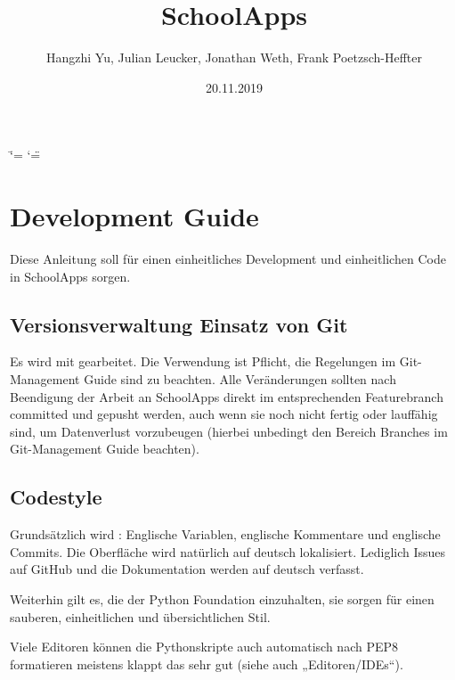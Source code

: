 \documentclass[letterpaper,10pt,ngerman]{sphinxmanual}
\title{SchoolApps}
\date{20.11.2019}
\author{Hangzhi Yu, Julian Leucker, Jonathan Weth, Frank Poetzsch-Heffter}
\begin{document}
\ifdefined\shorthandoff
  \ifnum\catcode`\=\string=\active\shorthandoff{=}\fi
  \ifnum\catcode`\"=\active{}\fi
\fi

\pagestyle{empty}
\sphinxmaketitle
\pagestyle{plain}
\sphinxtableofcontents
\pagestyle{normal}
\label{\detokenize{index::doc}}



\chapter{Development Guide}
\label{\detokenize{dev/dev:development-guide}}\label{\detokenize{dev/dev::doc}}
Diese Anleitung soll für einen einheitliches Development und einheitlichen Code in SchoolApps sorgen.


\section{Versionsverwaltung \textendash{} Einsatz von Git}
\label{\detokenize{dev/dev:versionsverwaltung-einsatz-von-git}}
Es wird mit  gearbeitet. Die Verwendung ist Pflicht, die Regelungen im Git-Management Guide sind zu beachten. Alle Veränderungen sollten nach Beendigung der Arbeit an SchoolApps direkt im entsprechenden Featurebranch committed und gepusht werden, auch wenn sie noch nicht fertig oder lauffähig sind, um Datenverlust vorzubeugen (hierbei unbedingt den Bereich Branches im Git-Management Guide beachten).


\section{Codestyle}
\label{\detokenize{dev/dev:codestyle}}
Grundsätzlich wird : Englische Variablen, englische Kommentare und englische Commits. Die Oberfläche wird natürlich auf deutsch lokalisiert. Lediglich Issues auf GitHub und die Dokumentation werden auf deutsch verfasst.

Weiterhin gilt es, die  der Python Foundation einzuhalten, sie sorgen für einen sauberen, einheitlichen und übersichtlichen Stil.

 Viele Editoren können die Pythonskripte auch automatisch nach PEP8 formatieren \textendash{} meistens klappt das sehr gut (siehe auch „Editoren/IDEs“).
\end{document}
